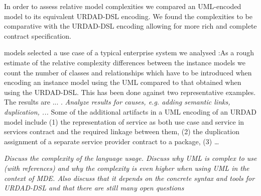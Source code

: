 In order to assess relative model complexities we compared an UML-encoded model to its equivalent URDAD-DSL encoding. We found the complexities to be comparative with the URDAD-DSL encoding allowing for more rich and complete contract specification.

models selected a use case of a typical enterprise system we analysed :As a rough estimate of the relative complexity differences between the instance models we count the number of classes and relationships which have to be introduced when encoding an instance model using the UML compared to that obtained when using the URDAD-DSL. This has been done against two representative examples. The results are ... . \emph{Analyze results for causes, e.g. adding semantic links, duplication, ...} Some of the additional artifacts in a UML encoding of an URDAD model include (1) the representation of service as both use case and service in services contract and the required linkage between them, (2) the duplication assignment of a separate service provider contract to a package, (3) \dots

\emph{Discuss the complexity of the language usage. Discuss why UML is complex to use (with references) and why the complexity is even higher when using UML in the context of MDE. Also discuss that it depends on the concrete syntax and tools for URDAD-DSL and that there are still many open questions}
